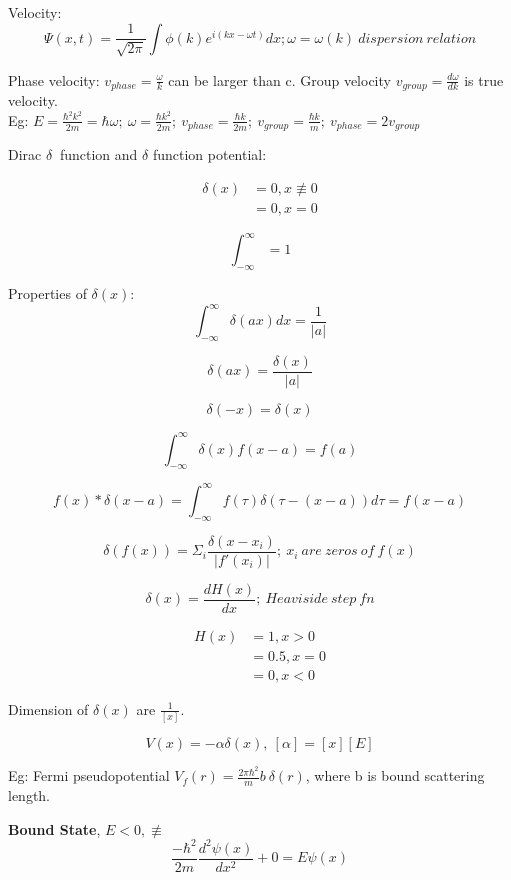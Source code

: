 \documentclass[12pt,a4paper]{article}
\begin{document}
Velocity:
\[
\Psi(x,t)= \frac{1}{\sqrt{2\pi}} \int \phi(k) e^{i(kx-\omega t)} dx ; \omega=\omega(k)\ dispersion \ relation
\]

Phase velocity: $v_{phase}=\frac{\omega}{k}$ can be larger than c. Group velocity $v_{group}=\frac{d\omega}{dk}$ is true velocity.\\

Eg: $E=\frac{\hbar^2 k^2}{2m}=\hbar \omega; \ \omega=\frac{\hbar k^2}{2m}; \  v_{phase}=\frac{\hbar k}{2m}; \ v_{group}=\frac{\hbar k}{m}; \ v_{phase}=2 v_{group} $\\

\pagebreak


Dirac $\delta \ $ function and $\delta$ function potential:

\begin{align}
\delta (x) &= 0, x \not\equiv 0 \\
           &= 0, x=0 
\end{align}

\[
\int _{-\infty}^{\infty} =1
\]

Properties of $\delta(x)$:\\
\[
\int _{-\infty}^{\infty} \delta(ax) dx = \frac{1}{|a|}
\]

\[
\delta(ax)=\frac{\delta (x)}{|a|}
\]

\[
\delta (-x)= \delta (x)
\]

\[
\int _{-\infty}^{\infty} \delta (x) f(x-a)=f(a)
\]

\[
f(x)* \delta (x-a)= \int _{-\infty} ^{\infty} f(\tau) \delta (\tau-(x-a))d\tau = f(x-a)
\]

\[
\delta (f(x))= \Sigma _i \frac{\delta (x-x_i)}{|f'(x_i)|}; \ x_i \ are \ zeros \ of \ f(x)
\]

\[
\delta (x) = \frac{dH(x)}{dx}; \ Heaviside \ step \  fn
\]

\begin{align}
 H (x) &= 1, x>0 \\
       &= 0.5, x=0 \\
       &= 0, x<0
\end{align}

Dimension of $\delta (x)$ are $\frac{1}{[x]}$.

\[
V(x)=-\alpha \delta (x),\ [\alpha]=[x][E]
\]

Eg: Fermi pseudopotential $V_f(r)= \frac{2\pi \hbar ^2}{m} b \  \delta (r)$, where b is bound scattering length.

\textbf{Bound State}, $E<0, \not \equiv$
\[
\frac{-\hbar ^2}{2m} \frac{d^2 \psi (x)}{dx^2} + 0 =E \psi(x)
\]
\end{document}
